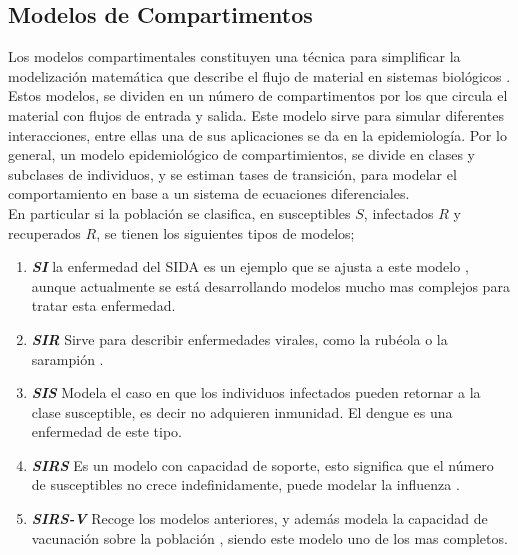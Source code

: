\documentclass[journal]{IEEEtran}
\begin{document}
\subsection{Modelos de Compartimentos}\label{Modelos}
Los modelos compartimentales constituyen una técnica para simplificar la
modelización matemática que describe el flujo de material en sistemas
biológicos \cite{compartimientos}.
Estos modelos, se dividen en un número de compartimentos por los que circula el
material con flujos de entrada y salida. Este modelo
sirve para simular diferentes interacciones, entre ellas una de sus
aplicaciones se da en la epidemiología. Por lo general, un modelo
epidemiológico de compartimientos, se divide en clases y subclases de
individuos, y se estiman tases de transición, para modelar el comportamiento
en base a un sistema de ecuaciones diferenciales.\\
\newline
En particular si la población se clasifica, en susceptibles $S$, infectados $R$
y recuperados $R$, se tienen los siguientes tipos de modelos;
\begin{enumerate}
  \item \textbf{\textit{SI}} la enfermedad del SIDA es un ejemplo que se
        ajusta a este modelo \cite{SIDA}, aunque actualmente se está desarrollando
        modelos mucho mas complejos para tratar esta enfermedad.
  \item \textbf{\textit{SIR}} Sirve para describir enfermedades virales,
        como la rubéola o la sarampión \cite{Rubeola}.
  \item \textbf{\textit{SIS}} Modela el caso en que los individuos
        infectados pueden retornar a la clase susceptible, es decir no adquieren
        inmunidad. El dengue \cite{Dengue} es una enfermedad de este tipo.
  \item \textbf{\textit{SIRS}} Es un modelo con capacidad de soporte,
        esto significa que el número de susceptibles no crece indefinidamente, puede
        modelar la influenza \cite{Influenza}.
  \item \textbf{\textit{SIRS-V}} Recoge los modelos anteriores, y además
        modela la capacidad de vacunación sobre la población \cite{Vacunacion}, siendo
        este modelo uno de los mas completos.
\end{enumerate}
\end{document}
